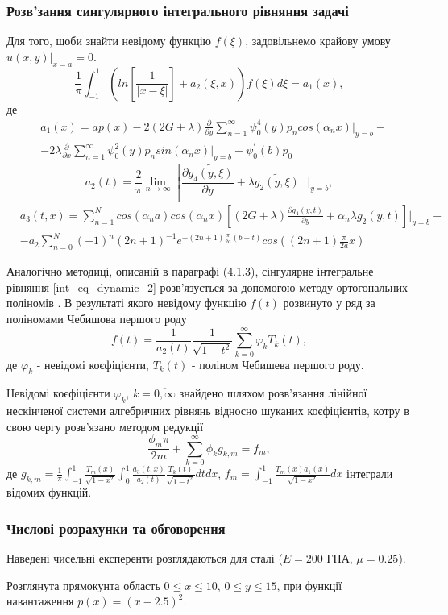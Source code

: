 \subsubsection{Розв'зання сингулярного інтегрального рівняння задачі}
Для того, щоби знайти невідому функцію $f(\xi)$, задовільнемо крайову умову $u(x, y) |_{x=a} = 0$.
\begin{equation}\label{int_eq_dynamic_2}
    \frac{1}{\pi} \int_{-1}^{1} \left( ln\left[ \frac{1}{\lvert x - \xi \rvert} \right] + a_2(\xi, x) \right) f(\xi) d\xi = a_1(x),
\end{equation}
де
\begin{align*}
    &a_1(x) = a p(x) - 2(2G + \lambda) \frac{\partial}{\partial y} \sum_{n=1}^{\infty} \psi_0^{4}(y) p_n cos(\alpha_n x)|_{y=b} - \nonumber \\
    &- 2\lambda \frac{\partial}{\partial x} \sum_{n=1}^{\infty}\psi_0^2(y) p_n sin(\alpha_n x)|_{y=b} - \psi_0^{'}(b) p_0
\end{align*}
\begin{equation*}
    a_2(t) = \frac{2}{\pi} \lim_{n \rightarrow \infty}\left[ \frac{\partial \widetilde{g_4(y, \xi)}}{\partial y} + \lambda \widetilde{g_2(y, \xi)} \right]|_{y=b}, 
\end{equation*}
\begin{align*}
    &a_3(t, x) = \sum_{n=1}^{N} cos(\alpha_n a) cos(\alpha_n x) \left[(2G + \lambda) \frac{\partial g_4(y, t)}{\partial y} + \alpha_n \lambda g_2(y, t) \right]|_{y=b} - \\
    & - a_2 \sum_{n=0}^{N} (-1)^n (2n + 1)^{-1} e^{-(2n + 1) \frac{\pi}{2a} (b - t)} cos((2n + 1) \frac{\pi}{2a} x)
\end{align*}

Аналогічно методиці, описаній в параграфі (4.1.3), сінгулярне інтегральне рівняння \eqref{int_eq_dynamic_2}
розв'язується за допомогою методу ортогональних поліномів \cite{popov_3}.
В результаті якого невідому функцію $f(t)$ розвинуто у ряд за поліномами Чебишова першого роду
\begin{equation}\label{unk_fun_dynamic_2}
    f(t) = \frac{1}{a_2(t)} \frac{1}{\sqrt{1 - t^2}} \sum_{k=0}^{\infty} \varphi_k T_{k}(t),
\end{equation}
де $\varphi_k$ - невідомі коєфіцієнти, $T_{k}(t)$ - поліном Чебишева першого роду.

Невідомі коєфіцієнти $\varphi_k$, $k=\overline{0, \infty}$ знайдено шляхом розв'язання лінійної нескінченої системи алгебричних рівнянь відносно шуканих коєфіцієнтів,
котру в свою чергу розв'язано методом редукції
\begin{equation}\label{int_system_dynamic_2}
    \frac{\phi_m \pi}{2m} + \sum_{k=0}^{\infty} \phi_k g_{k, m} = f_m,
\end{equation}
де $g_{k, m} = \frac{1}{\pi} \int_{-1}^{1} \frac{T_{m}(x)}{\sqrt{1 - x^2}} \int_{0}^{1} \frac{a_3(t, x )}{a_2(t)} \frac{T_{k}(t)}{\sqrt{1 - t^2}} dt dx$,
$f_m = \int_{-1}^{1} \frac{T_{m}(x) a_1(x)}{\sqrt{1 - x^2}} dx$ інтеграли відомих функцій.

\subsubsection{Числові розрахунки та обговорення}
Наведені чисельні експеренти розглядаються для сталі ($E=200$ ГПА, $\mu=0.25$).

Розглянута прямокунта область $0 \le x \le 10$, $0 \le y \le 15$, при функції навантаження $p(x)=(x-2.5)^2$.
